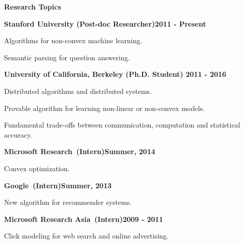 \documentclass[11pt]{res} %
\newenvironment{my_item}{
\begin{itemize}
  \setlength{\itemsep}{0pt}
  \setlength{\parskip}{0pt}
  \setlength{\parsep}{0pt}}
{\end{itemize}
}
\begin{document}
{\begin{resume}
{\Large\bf Research Topics}

\vspace{-5pt}
\textbf{Stanford University (Post-doc Researcher)\hfill 2011 - Present}\\
\vspace{-10pt}
\begin{my_item}
\item Algorithms for non-convex machine learning.
\item Semantic parsing for question answering.
\end{my_item}


\vspace{-5pt}
\textbf{University of California, Berkeley (Ph.D. Student) \hfill 2011 - 2016}\\
\vspace{-10pt}
\begin{my_item}
\item Distributed algorithms and distributed systems.
\item Provable algorithm for learning non-linear or non-convex models.
\item Fundamental trade-offs between communication, computation and statistical accuracy.
\end{my_item}

\vspace{-5pt}
\textbf{Microsoft Research~(Intern)\hfill Summer, 2014}\\
\vspace{-10pt}
\begin{my_item}
\item Convex optimization. 
\end{my_item}

\vspace{-5pt}
\textbf{Google~(Intern)\hfill Summer, 2013}\\
\vspace{-10pt}
\begin{my_item}
\item New algorithm for recommender systems.
\end{my_item}

\vspace{-8pt}
\textbf{Microsoft Research Asia~(Intern)\hfill 2009 - 2011}\\
\vspace{-10pt}
\begin{my_item}
	\item Click modeling for web search and online advertising.
\end{my_item}


\end{resume}}
\end{document}
